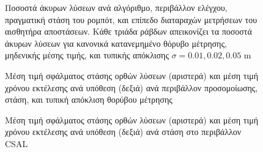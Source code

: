 \begin{figure}
  \hspace{-1.5cm}
  
  \vspace{-1cm}
\caption{\small Ποσοστά άκυρων λύσεων ανά αλγόριθμο, περιβάλλον ελέγχου,
         πραγματική στάση του ρομπότ, και επίπεδο διαταραχών μετρήσεων του
         αισθητήρα αποστάσεων. Κάθε τριάδα ράβδων απεικονίζει τα ποσοστά
         άκυρων λύσεων για κανονικά κατανεμημένο θόρυβο μέτρησης, μηδενικής
         μέσης τιμής, και τυπικής απόκλισης $\sigma = 0.01, 0.02, 0.05$ m}
\label{fig:02_03_04:outliers}
\end{figure}

\begin{figure}
  \hspace{-0.5cm}
  \begin{subfigure}{0.5\linewidth}
    
  \end{subfigure}\hspace{1.0cm}
  \begin{subfigure}{0.5\linewidth}
    
  \end{subfigure}
  \vspace{-2.5cm}
  \caption{\small Μέση τιμή σφάλματος στάσης ορθών λύσεων (αριστερά) και μέση
           τιμή χρόνου εκτέλεσης ανά υπόθεση (δεξιά) ανά περιβάλλον
           προσομοίωσης, στάση, και τυπική απόκλιση θορύβου μέτρησης}
\label{fig:02_03_04:sim_pose_errors_and_exec_times}
\end{figure}

\begin{figure}[h]
  \hspace{1cm}
  \begin{subfigure}{0.5\linewidth}
    
  \end{subfigure}%
  \begin{subfigure}{0.5\linewidth}
    
  \end{subfigure}
  \vspace{1cm}
\caption{\small Μέση τιμή σφάλματος στάσης ορθών λύσεων (αριστερά) και μέση
         τιμή χρόνου εκτέλεσης ανά υπόθεση (δεξιά) ανά στάση στο περιβάλλον
         CSAL}
\label{fig:02_03_04:csal_pose_errors_and_exec_times}
\end{figure}

